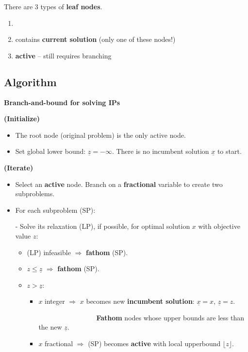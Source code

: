 \documentclass[11pt]{article}
\renewcommand{\labelitemii}{$\circ$}
\renewcommand{\labelitemiii}{$\diamond$}
\theoremstyle{definition}
\newcommand{\answerbox}[3]{%
  \fbox{%
    \begin{minipage}[#1]{#2}
      \hfill\vspace{#3}
    \end{minipage}
  }
}
\newcommand{\wordbox}{\answerbox{c}{1.2in}{.7cm}}
\begin{document}
\begin{itemize}
There are 3 types of \textbf{leaf nodes}.
	\begin{enumerate}[(1)]
		\item \wordbox %
		\item contains \textbf{current \wordbox solution} (only one of these nodes!)
		\item \textbf{active} -- still requires branching
	\end{enumerate}

\end{itemize}

\newpage
\subsection{Algorithm}

\begin{tcolorbox}
\textbf{Branch-and-bound for solving IPs}

\bigskip
\textbf{(Initialize)}
\begin{itemize}
\item The root node (original problem) is the only active node.  
\item Set global lower bound: $\underline{z} = -\infty$.  There is no incumbent solution $\underline{x}$ to start.
\end{itemize}

\bigskip
\textbf{(Iterate)}
\begin{itemize}
\item Select an \textbf{active} node.  Branch on a \textbf{fractional} variable to create two subproblems.

\item For each subproblem (SP):

- Solve its relaxation (LP), if possible, for optimal solution $x$ with objective value $z$:
\renewcommand\labelitemii{}
\begin{itemize} 
	\item (LP) infeasible $\Rightarrow$ \textbf{fathom} (SP).
	\item $z \leq \underline{z}$ $\Rightarrow$ \textbf{fathom} (SP).
	\item $z > \underline{z}$:
\renewcommand\labelitemiii{}
	\begin{itemize}
		\item $x$ integer $\Rightarrow$ $x$ becomes new \textbf{incumbent solution}: $\underline{x} = x$, $\underline{z} = z$.

 ~~~~~~~~~~~~~~~~~\textbf{Fathom} nodes whose upper bounds are less than the new $\underline{z}$.
		\item $x$ fractional $\Rightarrow$ (SP) becomes \textbf{active} with local upperbound $\lfloor z \rfloor$.
	\end{itemize}


\end{itemize}
\end{itemize}
\end{tcolorbox}
\end{document}
